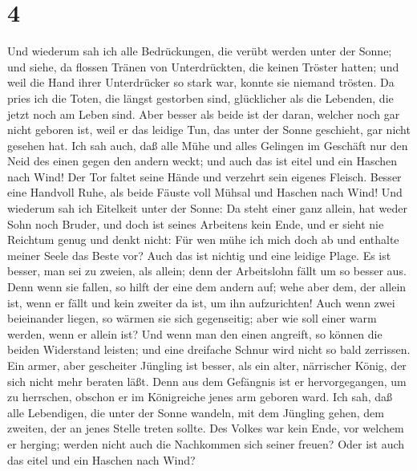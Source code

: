 \hypertarget{section-3}{%
\section{4}\label{section-3}}

 Und wiederum sah ich alle Bedrückungen, die verübt werden
unter der Sonne; und siehe, da flossen Tränen von Unterdrückten, die
keinen Tröster hatten; und weil die Hand ihrer Unterdrücker so stark
war, konnte sie niemand trösten.  Da pries ich die Toten,
die längst gestorben sind, glücklicher als die Lebenden, die jetzt noch
am Leben sind.  Aber besser als beide ist der daran,
welcher noch gar nicht geboren ist, weil er das leidige Tun, das unter
der Sonne geschieht, gar nicht gesehen hat.  Ich sah auch,
daß alle Mühe und alles Gelingen im Geschäft nur den Neid des einen
gegen den andern weckt; und auch das ist eitel und ein Haschen nach
Wind!  Der Tor faltet seine Hände und verzehrt sein
eigenes Fleisch.  Besser eine Handvoll Ruhe, als beide
Fäuste voll Mühsal und Haschen nach Wind!  Und wiederum
sah ich Eitelkeit unter der Sonne:  Da steht einer ganz
allein, hat weder Sohn noch Bruder, und doch ist seines Arbeitens kein
Ende, und er sieht nie Reichtum genug und denkt nicht: Für wen mühe ich
mich doch ab und enthalte meiner Seele das Beste vor? Auch das ist
nichtig und eine leidige Plage.  Es ist besser, man sei zu
zweien, als allein; denn der Arbeitslohn fällt um so besser aus.
 Denn wenn sie fallen, so hilft der eine dem andern auf;
wehe aber dem, der allein ist, wenn er fällt und kein zweiter da ist, um
ihn aufzurichten!  Auch wenn zwei beieinander liegen, so
wärmen sie sich gegenseitig; aber wie soll einer warm werden, wenn er
allein ist?  Und wenn man den einen angreift, so können
die beiden Widerstand leisten; und eine dreifache Schnur wird nicht so
bald zerrissen.  Ein armer, aber gescheiter Jüngling ist
besser, als ein alter, närrischer König, der sich nicht mehr beraten
läßt.  Denn aus dem Gefängnis ist er hervorgegangen, um
zu herrschen, obschon er im Königreiche jenes arm geboren ward.
 Ich sah, daß alle Lebendigen, die unter der Sonne
wandeln, mit dem Jüngling gehen, dem zweiten, der an jenes Stelle treten
sollte.  Des Volkes war kein Ende, vor welchem er
herging; werden nicht auch die Nachkommen sich seiner freuen? Oder ist
auch das eitel und ein Haschen nach Wind?

